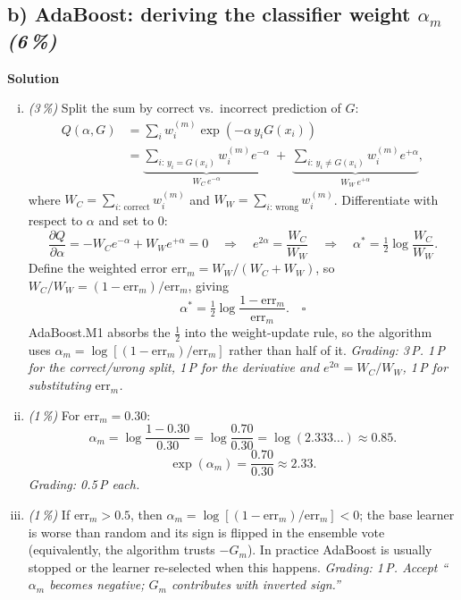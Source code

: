 \documentclass[11pt,a4paper]{article}
\newcommand{\subpoints}[1]{\textit{(#1\,\%)}}
\newcommand{\sol}{\noindent\textbf{Solution}}
\begin{document}
\subsection*{b) AdaBoost: deriving the classifier weight $\alpha_m$ \subpoints{6}}
\sol{}
\begin{enumerate}[(i)]
  \item \subpoints{3} Split the sum by correct vs.\ incorrect prediction of $G$:
        \begin{align*}
        Q(\alpha, G) &= \sum_i w_i^{(m)} \exp(-\alpha\, y_i G(x_i)) \\
                     &= \underbrace{\sum_{i:\, y_i = G(x_i)} w_i^{(m)} e^{-\alpha}}_{W_C \, e^{-\alpha}}
                      \;+\; \underbrace{\sum_{i:\, y_i \neq G(x_i)} w_i^{(m)} e^{+\alpha}}_{W_W \, e^{+\alpha}},
        \end{align*}
        where $W_C = \sum_{i:\,\text{correct}} w_i^{(m)}$ and $W_W = \sum_{i:\,\text{wrong}} w_i^{(m)}$.
        Differentiate with respect to $\alpha$ and set to $0$:
        $$\frac{\partial Q}{\partial \alpha} = -W_C e^{-\alpha} + W_W e^{+\alpha} = 0
          \quad\Longrightarrow\quad e^{2\alpha} = \frac{W_C}{W_W}
          \quad\Longrightarrow\quad \alpha^* = \tfrac{1}{2}\log \frac{W_C}{W_W}.$$
        Define the weighted error $\mathrm{err}_m = W_W / (W_C + W_W)$, so
        $W_C / W_W = (1 - \mathrm{err}_m)/\mathrm{err}_m$, giving
        $$\boxed{\alpha^* = \tfrac{1}{2}\log \frac{1 - \mathrm{err}_m}{\mathrm{err}_m}}. \quad\square$$
        AdaBoost.M1 absorbs the $\tfrac{1}{2}$ into the weight-update rule, so the algorithm uses
        $\alpha_m = \log[(1 - \mathrm{err}_m)/\mathrm{err}_m]$ rather than half of it.
        \emph{Grading: 3\,P. 1\,P for the correct/wrong split, 1\,P for the derivative and
        $e^{2\alpha} = W_C/W_W$, 1\,P for substituting $\mathrm{err}_m$.}

  \item \subpoints{1} For $\mathrm{err}_m = 0.30$:
        $$\alpha_m = \log\frac{1 - 0.30}{0.30} = \log\frac{0.70}{0.30} = \log(2.333\ldots) \approx \boxed{0.85}.$$
        $$\exp(\alpha_m) = \frac{0.70}{0.30} \approx \boxed{2.33}.$$
        \emph{Grading: 0.5\,P each.}

  \item \subpoints{1} If $\mathrm{err}_m > 0.5$, then $\alpha_m = \log[(1-\mathrm{err}_m)/\mathrm{err}_m] < 0$;
        the base learner is worse than random and its sign is flipped in the ensemble vote
        (equivalently, the algorithm trusts $-G_m$). In practice AdaBoost is usually stopped
        or the learner re-selected when this happens.
        \emph{Grading: 1\,P. Accept ``$\alpha_m$ becomes negative; $G_m$ contributes with
        inverted sign.''}


\end{enumerate}
\end{document}
